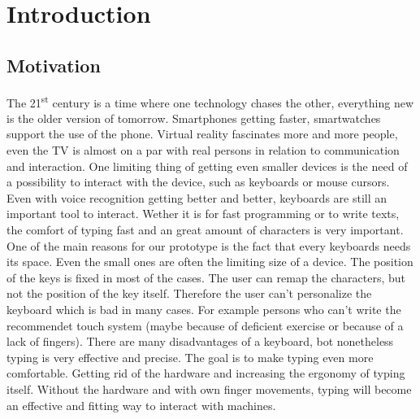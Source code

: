\section{Introduction}
\subsection{Motivation}
The 21\textsuperscript{st} century is a time where one technology chases the other, everything new is the older version of tomorrow. Smartphones getting faster, smartwatches support the use of the phone. Virtual reality fascinates more and more people, even the TV is almost on a par with real persons in relation to communication and interaction.
One limiting thing of getting even smaller devices is the need of a possibility to interact with the device, such as keyboards or mouse cursors. Even with voice recognition getting better and better, keyboards are still an important tool to interact. Wether it is for fast programming or to write texts, the comfort of typing fast and an great amount of characters is very important.
One of the main reasons for our prototype is the fact that every keyboards needs its space. Even the small ones are often the limiting size of a device.  
The position of the keys is fixed in most of the cases. The user can remap the characters, but not the position of the key itself. Therefore the user can't personalize the keyboard which is bad in many cases.
For example persons who can't write the recommendet touch system (maybe because of deficient exercise or because of a lack of fingers).
There are many disadvantages of a keyboard, bot nonetheless typing is very effective and precise.
The goal is to make typing even more comfortable. Getting rid of the hardware and increasing the ergonomy of typing itself. Without the hardware and with own finger movements, typing will become an effective and fitting way to interact with machines.



